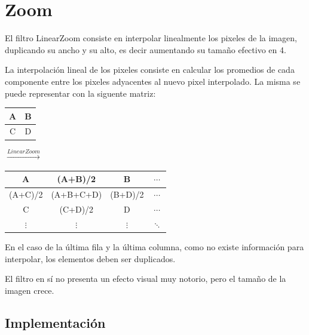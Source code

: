 
\section{Zoom}

El filtro LinearZoom consiste en interpolar linealmente los pixeles de la imagen, duplicando su ancho y su alto, es decir aumentando su tamaño efectivo en 4.

La interpolación lineal de los pixeles consiste en calcular los promedios de cada componente entre los pixeles adyacentes al nuevo pixel interpolado. La misma se puede representar con la siguente matriz:

\begin{table}[H]
  \centering
  \begin{tabular}{ | c | c | }
    \hline
    A & B \\ \hline
    C & D \\
    \hline
  \end{tabular}
  {\LARGE$\xrightarrow{LinearZoom}$}
  \begin{tabular}{ | c | c | c | c |}
    \hline
    A & (A+B)/2 & B & $\cdots$ \\ \hline
    (A+C)/2 & (A+B+C+D) & (B+D)/2 & $\cdots$ \\ \hline
    C & (C+D)/2 & D & $\cdots$ \\ \hline
    $\vdots$ & $\vdots$ & $\vdots$ & $\ddots$ \\
    \hline
  \end{tabular}
\end{table}

En el caso de la última fila y la última columna, como no existe información para interpolar, los elementos deben ser duplicados.

El filtro en sí no presenta un efecto visual muy notorio, pero el tamaño de la imagen crece.

\subsection{Implementación}

